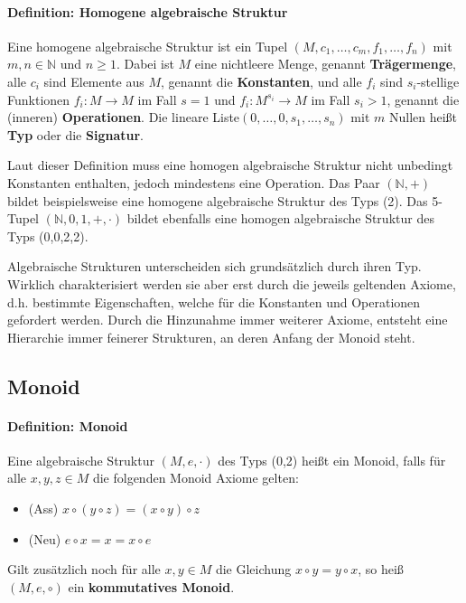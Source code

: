 \paragraph{Definition: Homogene algebraische Struktur}
Eine homogene algebraische Struktur ist ein Tupel $(M,c_1,\dots,c_m,f_1,\dots,f_n)$ mit $m,n \in \mathbb{N}$ und $n \geq 1$. Dabei ist $M$ eine nichtleere Menge, genannt \textbf{Trägermenge}, alle $c_i$ sind Elemente aus $M$, genannt die \textbf{Konstanten}, und alle $f_i$ sind $s_i$-stellige Funktionen $f_i:M \rightarrow M$ im Fall $s = 1$ und $f_i:M^{s_i} \rightarrow M$ im Fall $s_i>1$, genannt die (inneren) \textbf{Operationen}. Die lineare Liste$(0,\dots,0,s_1,\dots,s_n)$ mit $m$ Nullen heißt \textbf{Typ} oder die \textbf{Signatur}.\newline

Laut dieser Definition muss eine homogen algebraische Struktur nicht unbedingt Konstanten enthalten, jedoch mindestens eine Operation. Das Paar $(\mathbb{N},+)$ bildet beispielsweise eine homogene algebraische Struktur des Typs (2). Das 5-Tupel $(\mathbb{N},0,1,+,\cdot)$ bildet ebenfalls eine homogen algebraische Struktur des Typs (0,0,2,2).

Algebraische Strukturen unterscheiden sich grundsätzlich durch ihren Typ. Wirklich charakterisiert werden sie aber erst durch die jeweils geltenden Axiome, d.h. bestimmte Eigenschaften, welche für die Konstanten und Operationen gefordert werden. Durch die Hinzunahme immer weiterer Axiome, entsteht eine Hierarchie immer feinerer Strukturen, an deren Anfang der Monoid steht.\cite[S. 355, 356]{Berghammer.2021}

\subsection{Monoid}

\paragraph{Definition: Monoid}
Eine algebraische Struktur $(M,e,\cdot)$ des Typs (0,2) heißt ein Monoid, falls für alle $x,y,z\in M$ die folgenden Monoid Axiome gelten:
\begin{itemize}
    \item (Ass) $x \circ (y \circ z) = (x \circ y) \circ z$
    \item (Neu) $e \circ x = x = x \circ e$
\end{itemize}  Gilt zusätzlich noch für alle $x,y \in M$ die Gleichung $x \circ y = y \circ x$, so heiß $(M,e,\circ)$ ein \textbf{kommutatives Monoid}.\\

